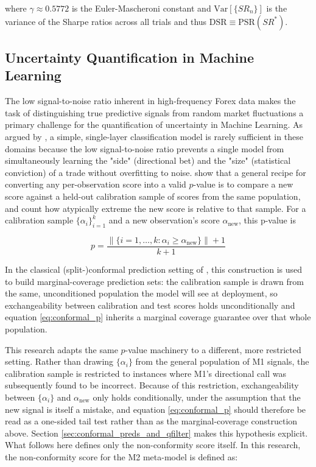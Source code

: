 \documentclass[12pt, a4paper]{article}
\begin{document}
where \(\gamma \approx 0.5772\) is the Euler-Mascheroni constant and \(\text{Var}[\{SR_n\}]\) is the variance of the Sharpe ratios across all trials and 
thus \( \text{DSR} \equiv \text{PSR}(SR^*) \). 


\subsection{Uncertainty Quantification in Machine Learning}\label{sec:conformal_preds}

The low signal-to-noise ratio inherent in high-frequency Forex data makes the task of distinguishing true predictive signals 
from random market fluctuations a primary challenge for the quantification of uncertainty in Machine Learning.
As argued by \textcite{lopez_de_prado_advances_2018}, a simple, single-layer classification model is rarely sufficient in these domains 
because the low signal-to-noise ratio prevents a single model from simultaneously learning the "side" (directional bet) and 
the "size" (statistical conviction) of a trade without overfitting to noise. 
\textcite{shafer_tutorial_2008} show that a general recipe for converting any per-observation score into a valid $p$-value is to compare 
a new score against a held-out calibration sample of scores from the same population, and count how atypically extreme the new score is 
relative to that sample. For a calibration sample $\{\alpha_i\}_{i=1}^k$ and a new observation's score $\alpha_{\text{new}}$, this p-value is

\begin{equation}
p = \frac{\left\|\{i = 1, \ldots, k : \alpha_i \geq \alpha_{\text{new}}\}\right\| + 1}{k + 1}
\label{eq:conformal_p}
\end{equation}

In the classical (split-)conformal prediction setting of \textcite{shafer_tutorial_2008}, this construction is used to build 
marginal-coverage prediction sets: the calibration sample is drawn from the same, unconditioned population the model 
will see at deployment, so exchangeability between calibration and test scores holds unconditionally and equation \ref{eq:conformal_p} 
inherits a marginal coverage guarantee over that whole population.

This research adapts the same $p$-value machinery to a different, more restricted setting. Rather than drawing $\{\alpha_i\}$ from 
the general population of M1 signals, the calibration sample is restricted to instances where M1's directional call was 
subsequently found to be incorrect. Because of this restriction, exchangeability between $\{\alpha_i\}$ and $\alpha_{\text{new}}$ 
only holds conditionally, under the assumption that the new signal is itself a mistake, and equation \ref{eq:conformal_p} should 
therefore be read as a one-sided tail test rather than as the marginal-coverage construction above. Section \ref{sec:conformal_preds_and_qfilter} 
makes this hypothesis explicit. What follows here defines only the non-conformity score itself. In this research, the 
non-conformity score for the M2 meta-model is defined as:
\end{document}
